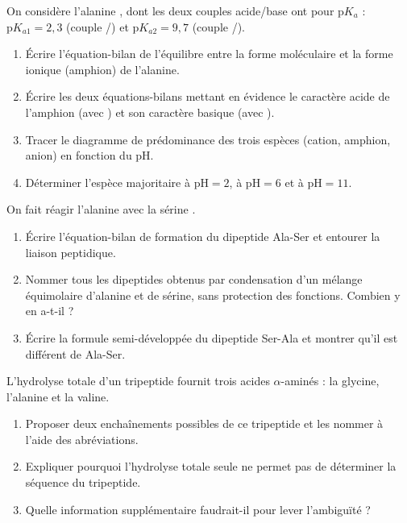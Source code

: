 \documentclass[11pt]{article}
\begin{document}
\begin{exercice}
On considère l'alanine , dont les deux couples acide/base ont pour $\mathrm{p}K_a$ : $\mathrm{p}K_{a1} = 2,3$ (couple /) et $\mathrm{p}K_{a2} = 9,7$ (couple /).
\begin{enumerate}
\item Écrire l'équation-bilan de l'équilibre entre la forme moléculaire et la forme ionique (amphion) de l'alanine.
\item Écrire les deux équations-bilans mettant en évidence le caractère acide de l'amphion (avec ) et son caractère basique (avec ).
\item Tracer le diagramme de prédominance des trois espèces (cation, amphion, anion) en fonction du pH.
\item Déterminer l'espèce majoritaire à $\mathrm{pH} = 2$, à $\mathrm{pH} = 6$ et à $\mathrm{pH} = 11$.
\end{enumerate}
\end{exercice}

\begin{exercice}
On fait réagir l'alanine  avec la sérine .
\begin{enumerate}
\item Écrire l'équation-bilan de formation du dipeptide Ala-Ser et entourer la liaison peptidique.
\item Nommer tous les dipeptides obtenus par condensation d'un mélange équimolaire d'alanine et de sérine, sans protection des fonctions. Combien y en a-t-il ?
\item Écrire la formule semi-développée du dipeptide Ser-Ala et montrer qu'il est différent de Ala-Ser.
\end{enumerate}
\end{exercice}

\begin{exercice}
L'hydrolyse totale d'un tripeptide fournit trois acides $\alpha$-aminés : la glycine, l'alanine et la valine.
\begin{enumerate}
\item Proposer deux enchaînements possibles de ce tripeptide et les nommer à l'aide des abréviations.
\item Expliquer pourquoi l'hydrolyse totale seule ne permet pas de déterminer la séquence du tripeptide.
\item Quelle information supplémentaire faudrait-il pour lever l'ambiguïté ?
\end{enumerate}
\end{exercice}
\end{document}
